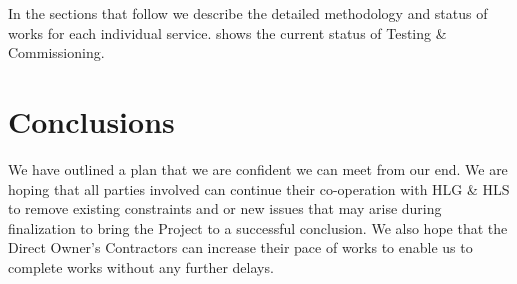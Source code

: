 In the sections that follow we describe the detailed methodology and status of works for each individual service.  shows the current status of Testing \& Commissioning.



\section*{Conclusions}

We have outlined a plan that we are confident we can meet from our end. We are hoping that all parties involved can continue their co-operation with HLG \& HLS to remove existing constraints and or new issues that may arise during finalization to bring the Project to a successful conclusion. We also hope that the Direct Owner's Contractors can increase their pace of works to enable us to complete works without any further delays.



